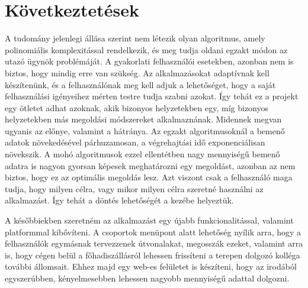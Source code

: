 \chapter{Következtetések}\label{ch:ALAP}

A tudomány jelenlegi állása szerint nem létezik olyan algoritmus, amely polinomiális komplexitással rendelkezik, és meg tudja oldani egzakt módon az utazó ügynök problémáját. A gyakorlati felhasználói esetekben, azonban nem is biztos, hogy mindig erre van szükség. Az alkalmazásokat adaptívnak kell készítenünk, és a felhasználónak meg kell adjuk a lehetőséget, hogy a saját felhasználási igényeihez mérten testre tudja szabni azokat. Így tehát ez a projekt egy ötletet adhat azoknak, akik bizonyos helyzetekben egy, míg bizonyos helyzetekben más megoldási módszereket alkalmaznának. Midennek megvan ugyanis az előnye, valamint a hátránya. Az egzakt algoritmusoknál a bemenő adatok növekedésével párhuzamosan, a végrehajtási idő exponenciálisan növekszik. A mohó algoritmusok ezzel ellentétben nagy mennyiségű bemenő adatra is nagyon gyorsan képesek meghatározni egy megoldást, azonban az nem biztos, hogy ez az optimális megoldás lesz. Azt viszont csak a felhasználó maga tudja, hogy milyen célra, vagy mikor milyen célra szeretné használni az alkalmazást. Így tehát a döntés lehetőségét a kezébe helyeztük.

A későbbiekben szeretném az alkalmazást egy újabb funkcionalitással, valamint platformmal kibővíteni. A csoportok menüpont alatt lehetőség nyílik arra, hogy a felhasználók egymásnak tervezzenek útvonalakat, megosszák ezeket, valamint arra is, hogy cégen belül a főhadiszállásról lehessen frissíteni a terepen dolgozó kolléga további állomsait. Ehhez majd egy web-es felületet is készíteni, hogy az irodából egyszerúbben, kényelmesebben lehessen nagyobb mennyiségű adattal dolgozni.

